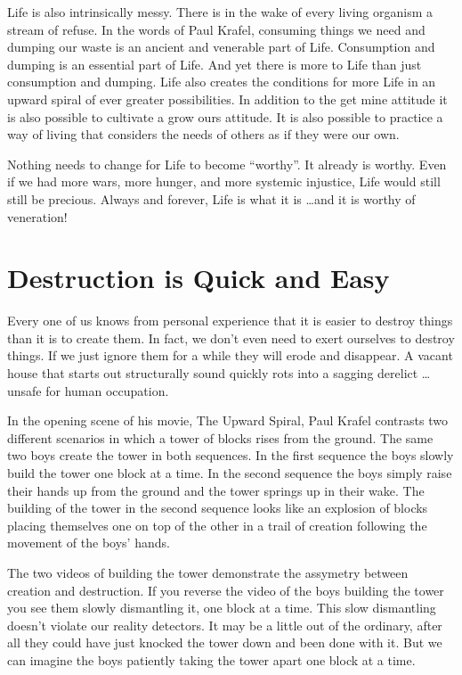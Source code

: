 \documentclass[ebook,12pt,openany,twoside]{memoir}
\newcommand{\imagefacingchapter}[1]{
  \cleartoverso
  \clearpage \null
  \thispagestyle{cleared}
  \AddToShipoutPictureBG*{%
    \AtStockLowerLeft{%
      \texttt{[image: \#1]}
    }
  }
  \clearpage
}
\begin{document}
Life is also intrinsically messy. There is in the wake of every living organism
a stream of refuse. In the words of Paul Krafel, consuming things we need and
dumping our waste is an ancient and venerable part of Life. Consumption and
dumping is an essential part of Life. And yet there is more to Life than just
consumption and dumping. Life also creates the conditions for more Life in an
upward spiral of ever greater possibilities. In addition to the get mine
attitude it is also possible to cultivate a grow ours attitude. It is also
possible to practice a way of living that considers the needs of others as if
they were our own.

Nothing needs to change for Life to become ``worthy''. It already is worthy.
Even if we had more wars, more hunger, and more systemic injustice, Life would
still still be precious. Always and forever, Life is what it is \ldots and it
is worthy of veneration!

\imagefacingchapter{images/CollapsingHouse}
\chapter{Destruction is Quick and Easy}

Every one of us knows from personal experience that it is easier to destroy
things than it is to create them. In fact, we don't even need to exert
ourselves to destroy things. If we just ignore them for a while they will erode
and disappear. A vacant house that starts out structurally sound quickly rots
into a sagging derelict \ldots unsafe for human occupation.

In the opening scene of his movie, The Upward Spiral, Paul Krafel contrasts two
different scenarios in which a tower of blocks rises from the ground. The same
two boys create the tower in both sequences. In the first sequence the boys
slowly build the tower one block at a time. In the second sequence the boys
simply raise their hands up from the ground and the tower springs up in their
wake. The building of the tower in the second sequence looks like an explosion
of blocks placing themselves one on top of the other in a trail of creation
following the movement of the boys' hands.

The two videos of building the tower demonstrate the assymetry between
creation and destruction. If you reverse the video of the boys building the
tower you see them slowly dismantling it, one block at a time. This slow
dismantling doesn't violate our reality detectors. It may be a little out of
the ordinary, after all they could have just knocked the tower down and been
done with it. But we can imagine the boys patiently taking the tower apart one
block at a time.
\end{document}
